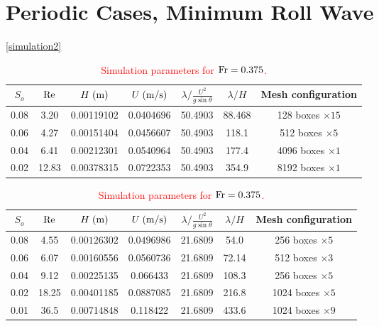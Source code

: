 \documentclass[a4paper]{article}
\newcommand{\fr}{{\rm{Fr}}}
\newcommand{\sa}{\sin\theta}
\begin{document}
\section{Periodic Cases, Minimum Roll Wave}
\autoref{simulation2}
\begin{table}[htbp]
\begin{subtable}{1\textwidth}
		\centering
		\begin{tabular}{ccccccc}
			$S_o$ & $\rm Re$ & $H\;{\rm (m)}$ & $U\;{\rm (m/s)}$ & $\lambda/\frac{U^2}{g\sa}$ & $\lambda/H$ & Mesh configuration\\
			\toprule
			0.08 & 3.20 & 0.00119102 & 0.0404696 & 50.4903 & 88.468 & 128 boxes $\times 15$\\
			
			0.06 & 4.27 & 0.00151404 & 0.0456607 & 50.4903 & 118.1 & 512 boxes $\times 5$\\
			
			0.04 & 6.41 & 0.00212301 & 0.0540964 & 50.4903 & 177.4 & 4096 boxes $\times 1$\\
			
			0.02 & 12.83 & 0.00378315 & 0.0722353 & 50.4903 & 354.9 & 8192 boxes $\times 1$\\
			
			\bottomrule 
		\end{tabular}
		\caption{\textcolor{red}{Simulation parameters for $\fr=0.375$.}}
		\label{params_0375}
	\end{subtable}
	\begin{subtable}{1\textwidth}
		\centering
		\begin{tabular}{ccccccc}
			$S_o$ & $\rm Re$ & $H\;{\rm (m)}$ & $U\;{\rm (m/s)}$ & $\lambda/\frac{U^2}{g\sa}$ & $\lambda/H$ & Mesh configuration\\
			\toprule
			0.08 & 4.55 & $0.00126302$ & $0.0496986$ & 21.6809 & 54.0 & 256 boxes $\times 5$\\
			
			0.06 & 6.07 & 0.00160556 & 0.0560736 & 21.6809 & 72.14 & 512 boxes $\times 3$\\
			
			0.04 & 9.12 & 0.00225135 & 0.066433 & 21.6809 & 108.3 & 256 boxes $\times 5$\\
			
			0.02 & 18.25 & 0.00401185 & 0.0887085 & 21.6809 & 216.8 & 1024 boxes $\times 5$\\
			
			0.01 & 36.5 & 0.00714848 & 0.118422 & 21.6809 & 433.6 & 1024 boxes $\times 9$\\
			

\end{tabular}
\end{subtable}
\end{table}
\end{document}
